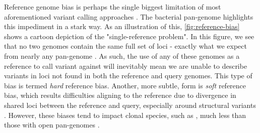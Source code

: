 Reference genome bias is perhaps the single biggest limitation of most aforementioned variant calling approaches \cite{Bertels2014,Bush2020,Olson2015}. The bacterial pan-genome highlights this impediment in a stark way. As an illustration of this, \autoref{fig:reference-bias} shows a cartoon depiction of the "single-reference problem". In this figure, we see that no two genomes contain the same full set of loci - exactly what we expect from nearly any pan-genome \cite{McInerney2017}. As such, the use of any of these genomes as a reference to call variant against will inevitably mean we are unable to describe variants in loci not found in both the reference and query genomes. This type of bias is termed \emph{hard} reference bias. Another, more subtle, form is \emph{soft} reference bias, which results difficulties aligning to the reference due to divergence in shared loci between the reference and query, especially around structural variants \cite{Price2017,Olson2015,Pightling2014}. However, these biases tend to impact clonal species, such as \mtb{}, much less than those with open pan-genomes \cite{Bush2020}.

